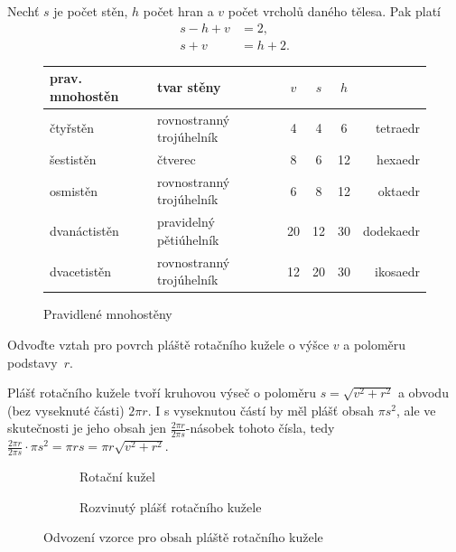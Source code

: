 \begin{veta}
    Nechť $s$ je počet stěn, $h$ počet hran a $v$ počet vrcholů daného tělesa. Pak
    platí
    \begin{align*}
        s-h+v &=2,\\
        s+v &=h+2.
    \end{align*}
\end{veta}

\begin{figure}[h]
	\centering
	\begin{tabular}{l|l|c|c|c|r}
    prav. mnohostěn & tvar stěny & $v$ & $s$ & $h$ & \, \\
    \hline
    čtyřstěn        & rovnostranný trojúhelník & 4 & 4&6 & tetraedr \\
    šestistěn       & čtverec & 8 & 6&12 & hexaedr \\
    osmistěn        & rovnostranný trojúhelník & 6 & 8&12 & oktaedr \\
    dvanáctistěn    & pravidelný pětiúhelník & 20 & 12&30 & dodekaedr \\
    dvacetistěn     & rovnostranný trojúhelník & 12 & 20&30 & ikosaedr \\
	\end{tabular}
	\caption{Pravidlené mnohostěny}
\end{figure}

\begin{priklad}
Odvoďte vztah pro povrch pláště rotačního kužele o výšce $v$ a poloměru
podstavy~$r$.
\end{priklad}

\begin{reseni}
Plášť rotačního kužele tvoří kruhovou výseč o poloměru $s=\sqrt{v^2 + r^2}$ a obvodu (bez vyseknuté části)
$2\pi r$. I s vyseknutou částí by měl plášť obsah $\pi s^2$, ale ve skutečnosti je jeho obsah jen
$\frac{2\pi r}{2 \pi s}$-násobek tohoto čísla, tedy $\frac{2 \pi r }{2\pi s } \cdot \pi s^2=\pi r s = \pi r \sqrt{v^2 + r^2}$.
\begin{figure}[h]
\begin{subfigure}{.5\textwidth}
	\centering
	\caption{Rotační kužel}
\end{subfigure}
\begin{subfigure}{.5\textwidth}
	\centering
	\caption{Rozvinutý plášť rotačního kužele}
\end{subfigure}
	\caption{Odvození vzorce pro obsah pláště rotačního kužele}
\end{figure}
\end{reseni}

